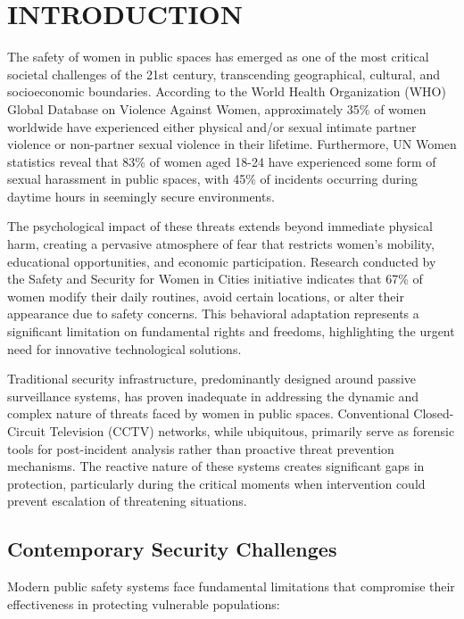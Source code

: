 \documentclass[12pt,a4paper]{article}
\begin{document}
\newpage
{}
\setcounter{page}{1}

\newpage
\section{INTRODUCTION}

The safety of women in public spaces has emerged as one of the most critical societal challenges of the 21st century, transcending geographical, cultural, and socioeconomic boundaries. According to the World Health Organization (WHO) Global Database on Violence Against Women, approximately 35\% of women worldwide have experienced either physical and/or sexual intimate partner violence or non-partner sexual violence in their lifetime. Furthermore, UN Women statistics reveal that 83\% of women aged 18-24 have experienced some form of sexual harassment in public spaces, with 45\% of incidents occurring during daytime hours in seemingly secure environments.

The psychological impact of these threats extends beyond immediate physical harm, creating a pervasive atmosphere of fear that restricts women's mobility, educational opportunities, and economic participation. Research conducted by the Safety and Security for Women in Cities initiative indicates that 67\% of women modify their daily routines, avoid certain locations, or alter their appearance due to safety concerns. This behavioral adaptation represents a significant limitation on fundamental rights and freedoms, highlighting the urgent need for innovative technological solutions.

Traditional security infrastructure, predominantly designed around passive surveillance systems, has proven inadequate in addressing the dynamic and complex nature of threats faced by women in public spaces. Conventional Closed-Circuit Television (CCTV) networks, while ubiquitous, primarily serve as forensic tools for post-incident analysis rather than proactive threat prevention mechanisms. The reactive nature of these systems creates significant gaps in protection, particularly during the critical moments when intervention could prevent escalation of threatening situations.

\subsection{Contemporary Security Challenges}

Modern public safety systems face fundamental limitations that compromise their effectiveness in protecting vulnerable populations:
\end{document}
